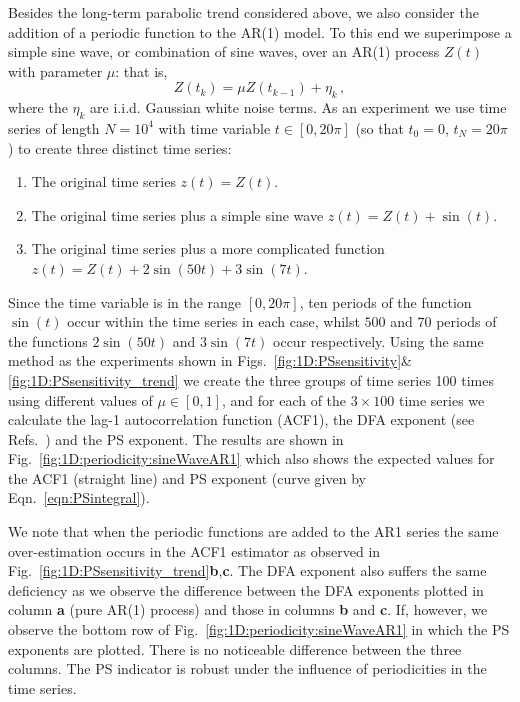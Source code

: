 \documentclass[10pt]{iopart}
\begin{document}
Besides the long-term parabolic trend considered above, we also consider the addition of a periodic function to the AR(1) model. To this end we superimpose a simple sine wave, or combination of sine waves, over an AR(1) process $Z(t)$ with parameter $\mu$: that is, 
\begin{equation}
	Z(t_k) = \mu Z(t_{k-1}) + \eta_k\,,
\end{equation}
where the $\eta_k$ are i.i.d. Gaussian white noise terms. As an experiment we use time series of length $N=10^4$ with time variable $t\in[0,20\pi]$ (so that $t_0=0$, $t_N=20\pi$) to create three distinct time series:
\begin{enumerate}
	\item The original time series $z(t) = Z(t)$.
	\item The original time series plus a simple sine wave $z(t) = Z(t) + \sin(t)$.
	\item The original time series plus a more complicated function $z(t) = Z(t) + 2\sin(50t)+3\sin(7t)$.
\end{enumerate}
Since the time variable is in the range $[0,20\pi]$, ten periods of the function $\sin(t)$ occur within the time series in each case, whilst $500$ and $70$ periods of the functions $2\sin(50t)$ and $3\sin(7t)$ occur respectively. Using the same method as the experiments shown in Figs.~\ref{fig:1D:PSsensitivity}\&\ref{fig:1D:PSsensitivity_trend} we create the three groups of time series 100 times using different values of $\mu\in[0,1]$, and for each of the $3\times100$ time series we calculate the lag-1 autocorrelation function (ACF1), the DFA exponent (see Refs.~\cite{kantelhardt2001, livina2007}) and the PS exponent. The results are shown in Fig.~\ref{fig:1D:periodicity:sineWaveAR1} which also shows the expected values for the ACF1 (straight line) and PS exponent (curve given by Eqn.~\ref{eqn:PSintegral}). 

We note that when the periodic functions are added to the AR1 series the same over-estimation occurs in the ACF1 estimator as observed in Fig.~\ref{fig:1D:PSsensitivity_trend}{\bf b},{\bf c}. The DFA exponent also suffers the same deficiency as we observe the difference between the DFA exponents plotted in column {\bf a} (pure AR(1) process) and those in columns {\bf b} and {\bf c}. If, however, we observe the bottom row of Fig.~\ref{fig:1D:periodicity:sineWaveAR1} in which the PS exponents are plotted. There is no noticeable difference between the three columns. The PS indicator is robust under the influence of periodicities in the time series. 
\end{document}
